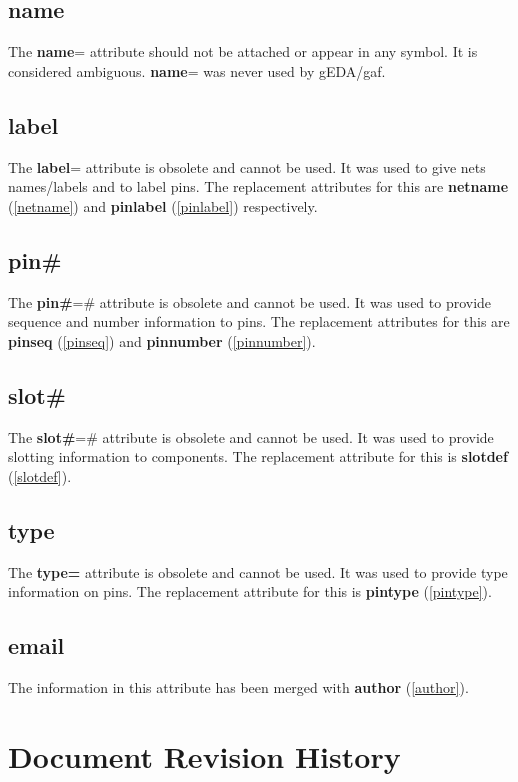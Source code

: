 \documentclass{article}
\begin{document}
\subsection{{\bf name}\label{name}}
The {\bf name}= attribute should not be attached or appear in any symbol.
It is considered ambiguous.  {\bf name}= was never used by gEDA/gaf.


\subsection{{\bf label}\label{label}}
The {\bf label}= attribute is obsolete and cannot be used.  It was 
used to give nets names/labels and to label pins.  The replacement
attributes for this are {\bf netname} (\ref{netname}) and 
{\bf pinlabel} (\ref{pinlabel}) respectively.


\subsection{{\bf pin\#}\label{pinPOUND}}
The {\bf pin\#}=\# attribute is obsolete and cannot be used.  It was
used to provide sequence and number information to pins.  The replacement
attributes for this are {\bf pinseq} (\ref{pinseq}) and {\bf pinnumber}
(\ref{pinnumber}).


\subsection{{\bf slot\#}\label{slotPOUND}}
The {\bf slot\#}=\# attribute is obsolete and cannot be used.  It was
used to provide slotting information to components.  The replacement
attribute for this is {\bf slotdef} (\ref{slotdef}).


\subsection{{\bf type}\label{type}}
The {\bf type=} attribute is obsolete and cannot be used.  It was
used to provide type information on pins. The replacement
attribute for this is {\bf pintype} (\ref{pintype}).

\subsection{\bf email\label{email}}
The information in this attribute has been merged with {\bf author}
(\ref{author}).

\newpage
\section{Document Revision History}
\end{document}
